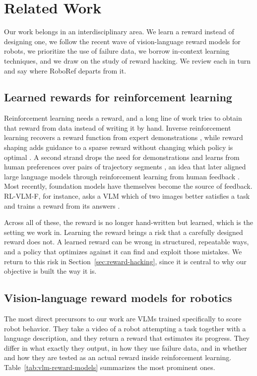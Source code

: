 \chapter{Related Work}
\label{sec:related-work}

Our work belongs in an interdisciplinary area. We learn a reward instead of designing one, we follow the recent wave of vision-language reward models for robots, we prioritize the use of failure data, we borrow in-context learning techniques, and we draw on the study of reward hacking. We review each in turn and say where RoboRef departs from it.

\section{Learned rewards for reinforcement learning}

Reinforcement learning needs a reward, and a long line of work tries to obtain that reward from data instead of writing it by hand. Inverse reinforcement learning recovers a reward function from expert demonstrations \citep{ng_algorithms_2000, abbeel_apprenticeship_2004}, while reward shaping adds guidance to a sparse reward without changing which policy is optimal \citep{ng_policy_1999}. A second strand drops the need for demonstrations and learns from human preferences over pairs of trajectory segments \citep{christiano_deep_2017}, an idea that later aligned large language models through reinforcement learning from human feedback \citep{ouyang_training_2022}. Most recently, foundation models have themselves become the source of feedback. RL-VLM-F, for instance, asks a VLM which of two images better satisfies a task and trains a reward from its answers \citep{wang_rl-vlm-f_2024}. 

Across all of these, the reward is no longer hand-written but learned, which is the setting we work in. Learning the reward brings a risk that a carefully designed reward does not. A learned reward can be wrong in structured, repeatable ways, and a policy that optimizes against it can find and exploit those mistakes. We return to this risk in Section~\ref{sec:reward-hacking}, since it is central to why our objective is built the way it is.

\section{Vision-language reward models for robotics}
\label{sec:related-vlm}

The most direct precursors to our work are VLMs trained specifically to score robot behavior. They take a video of a robot attempting a task together with a language description, and they return a reward that estimates its progress. They differ in what exactly they output, in how they use failure data, and in whether and how they are tested as an actual reward inside reinforcement learning. Table~\ref{tab:vlm-reward-models} summarizes the most prominent ones.

